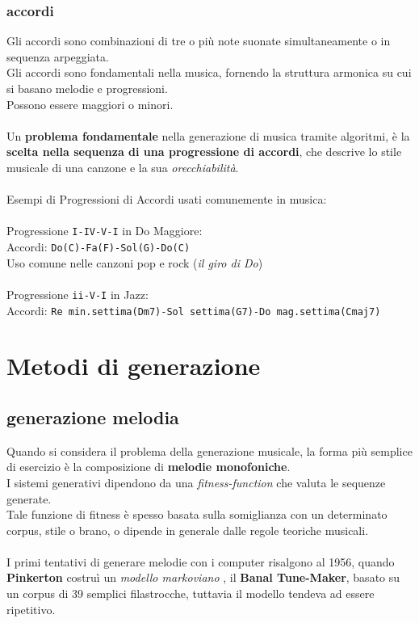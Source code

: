 \documentclass[a4paper,12pt]{report}
\begin{document}
\subsection{accordi}

Gli accordi sono combinazioni di tre o più note suonate simultaneamente o in sequenza arpeggiata. \\
Gli accordi sono fondamentali nella musica, fornendo la struttura armonica su cui si basano melodie e progressioni. \\
Possono essere maggiori o minori.\\
\\
Un \textbf{problema fondamentale} nella generazione di musica tramite algoritmi, è la \textbf{scelta nella sequenza di una progressione di accordi}, che descrive lo stile musicale di una canzone e la sua \textit{orecchiabilità}. \\
\\
Esempi di Progressioni di Accordi usati comunemente in musica:\\
\\
Progressione \texttt{I-IV-V-I} in Do Maggiore: \\
Accordi: \texttt{Do(C)-Fa(F)-Sol(G)-Do(C)} \\
Uso comune nelle canzoni pop e rock (\textit{il giro di Do}) \\
\\
Progressione \texttt{ii-V-I} in Jazz: \\
Accordi: \texttt{Re min.settima(Dm7)-Sol settima(G7)-Do mag.settima(Cmaj7)} \\

\chapter{Metodi di generazione}

\section{generazione melodia}

Quando si considera il problema della generazione musicale, la forma più semplice di esercizio è la composizione di \textbf{melodie monofoniche}.\\
I sistemi generativi dipendono da una \textit{fitness-function} che valuta le sequenze generate.\\
Tale funzione di fitness è spesso basata sulla somiglianza con un determinato corpus, stile o brano, o dipende in generale dalle regole teoriche musicali.\\
\\
I primi tentativi di generare melodie con i computer risalgono al 1956, quando \textbf{Pinkerton} costruì un \textit{modello markoviano} , il \textbf{Banal Tune-Maker}, basato su un corpus di 39 semplici filastrocche, tuttavia il modello tendeva ad essere ripetitivo.
\end{document}
